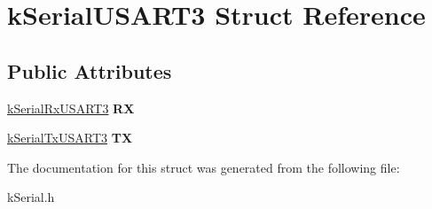 \hypertarget{structkSerialUSART3}{}\section{k\+Serial\+U\+S\+A\+R\+T3 Struct Reference}
\label{structkSerialUSART3}
\subsection*{Public Attributes}
\begin{DoxyCompactItemize}
\item 
\hyperlink{structkSerialRxUSART3}{k\+Serial\+Rx\+U\+S\+A\+R\+T3} {\bfseries RX}\hypertarget{structkSerialUSART3_a406a27d9bf5809370eee9536fd56bded}{}\label{structkSerialUSART3_a406a27d9bf5809370eee9536fd56bded}

\item 
\hyperlink{structkSerialTxUSART3}{k\+Serial\+Tx\+U\+S\+A\+R\+T3} {\bfseries TX}\hypertarget{structkSerialUSART3_a8a06e63e0001aedcd08ad35a47f102d8}{}\label{structkSerialUSART3_a8a06e63e0001aedcd08ad35a47f102d8}

\end{DoxyCompactItemize}


The documentation for this struct was generated from the following file\+:\begin{DoxyCompactItemize}
\item 
k\+Serial.\+h\end{DoxyCompactItemize}
